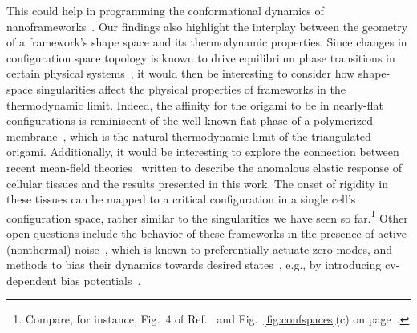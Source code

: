 This could help in programming the conformational dynamics of nanoframeworks~\cite{dunn2015}.
Our findings also highlight the interplay between the geometry of a framework's shape space and its thermodynamic properties.
Since changes in configuration space topology is known to drive equilibrium phase transitions in certain physical systems~\cite{kastner2008}, it would then be interesting to consider how shape-space singularities affect the physical properties of frameworks in the thermodynamic limit.
Indeed, the affinity for the origami to be in nearly-flat configurations is reminiscent of the well-known flat phase of a polymerized membrane~\cite{abraham1990,bowick1996}, which is the natural thermodynamic limit of the triangulated origami.
Additionally, it would be interesting to explore the connection between recent mean-field theories~\cite{hernandez2022} written to describe the anomalous elastic response of cellular tissues and the results presented in this work.
The onset of rigidity in these tissues can be mapped to a critical configuration in a single cell's configuration space, rather similar to the singularities we have seen so far.\footnote{Compare, for instance, Fig.~4 of Ref.~\cite{hernandez2022} and Fig.~\ref{fig:confspaces}(c) on page~\pageref{fig:confspaces}.}
Other open questions include the behavior of these frameworks in the presence of active (nonthermal) noise~\cite{woodhouse2018}, which is known to preferentially actuate zero modes, and methods to bias their dynamics towards desired states~\cite{kang2019}, e.g., by introducing \ac{cv}-dependent bias potentials~\cite{kastner2011}.




